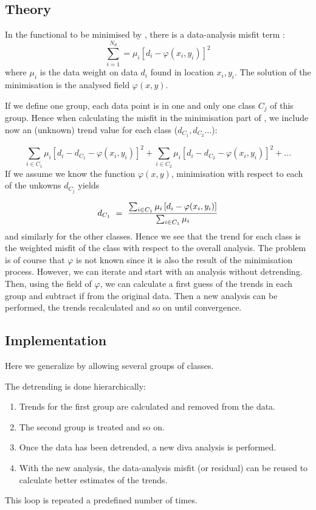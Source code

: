 \subsection{Theory}

In the functional to be minimised by \diva, there is a data-analysis misfit term :
\begin{equation}
\sum_{i=1}^{N_{d}} =  \mu_i \left[ d_i - \varphi(x_i,y_i) \right]^2
\end{equation}
where $\mu_i$ is the data weight on data $d_i$ found in location $x_i,y_i$. The solution of the minimisation is the analysed field $\varphi(x,y)$.


If we define one group, each data point is in one and only one class $C_j$ of this group. Hence
when calculating the misfit in the minimisation part of \diva , we include now an (unknown) trend value for each class ($d_{C_1}, d_{C_2} ...$):

\begin{equation}
\sum_{i\in C_1} \mu_i \left[ d_i -d_{C_1}- \varphi(x_i,y_i) \right]^2 + \sum_{i\in C_2} \mu_i \left[ d_i -d_{C_2}- \varphi(x_i,y_i) \right]^2 + ...
\end{equation}
If we assume we know the function $\varphi(x,y)$, minimisation with respect to each of the unkowns $d_{C_j}$ yields


\begin{equation}
d_{C_1} ~=~{ \sum_{i\in C_1} \mu_i \left[ d_i - \varphi(x_i,y_i) \right] \over \sum_{i\in C_1} \mu_i }
\end{equation}
and similarly for the other classes. Hence we see that the trend for each class is the weighted misfit of the class with respect to the overall analysis.
The problem is of course that $\varphi$ is not known since it is also the result of the minimisation process. However, we can iterate and start with an analysis without detrending. Then, using the field of $\varphi$, we can calculate a first guess of the trends in each group and subtract if from the original data. 
Then a new analysis can be performed, the trends recalculated and so on until convergence.


\subsection{Implementation}

Here we generalize by allowing several groups of classes.

The detrending is done hierarchically:
\begin{enumerate}
\item Trends for the first group are calculated and removed from the data. 
\item The second group is treated and so on.
\item Once the data has been detrended, a new diva analysis is performed. 
\item With the new analysis, the data-analysis misfit (or residual) can be reused to
calculate better estimates of the trends. 
\end{enumerate}
This loop is repeated a predefined number of times. 

